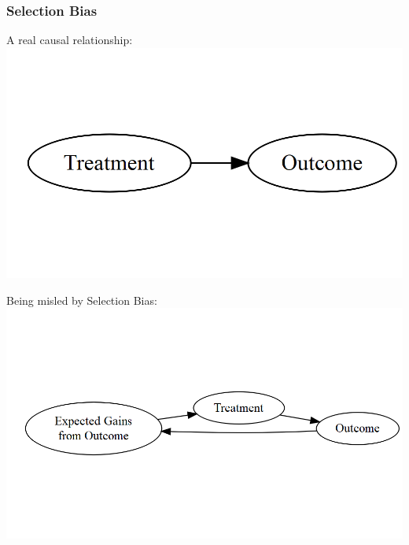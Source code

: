 \documentclass[xcolor=x11names,compress]{beamer}\usepackage[]{graphicx}\usepackage[]{xcolor}
\makeatletter
\def\maxwidth{ %
  \ifdim\Gin@nat@width>\linewidth
    \linewidth
  \else
    \Gin@nat@width
  \fi
}
\newenvironment{knitrout}{}{} %
\renewcommand{\(}{\begin{columns}}
\renewcommand{\)}{\end{columns}}
\newcommand{\<}[1]{\begin{column}{#1}}
\renewcommand{\>}{\end{column}}
\makeatother
\begin{document}
\begin{frame}
\frametitle{Selection Bias}
\begin{multicols}{2}
A real causal relationship:
\begin{knitrout}
\color{fgcolor}
\includegraphics[width=\maxwidth]{figure/explanation7-1} 
\end{knitrout}
\columnbreak

Being misled by Selection Bias:
\begin{knitrout}
\color{fgcolor}
\includegraphics[width=\maxwidth]{figure/explanation8-1} 
\end{knitrout}
\end{multicols}
\end{frame}
\end{document}
